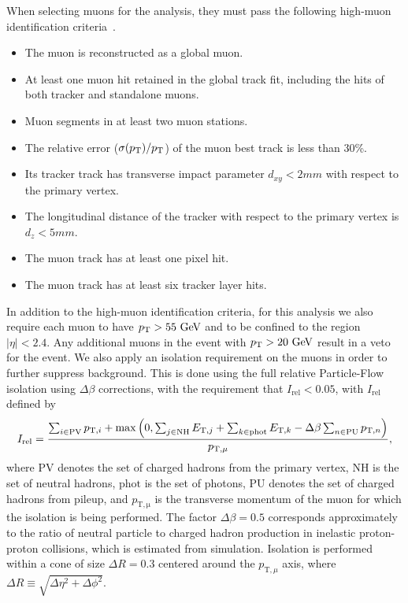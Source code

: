 When selecting muons for the analysis, they must pass the following high-\pt muon identification criteria~\cite{Sirunyan_2020}. %
\begin{itemize}
  \item The muon is reconstructed as a global muon.
  \item At least one muon hit retained in the global track fit, including the hits of both tracker and standalone muons.
  \item Muon segments in at least two muon stations.
  \item The \pt relative error ($\sigma(\pt)/\pt$) of the muon best track is less than 30\%.
  \item Its tracker track has transverse impact parameter $d_{xy}<2\unit{mm}$ with respect to the primary vertex.
  \item The longitudinal distance of the tracker with respect to the primary vertex is $d_z<5\unit{mm}$.
  \item The muon track has at least one pixel hit.
  \item The muon track has at least six tracker layer hits.
\end{itemize}

In addition to the high-\pt muon identification criteria, for this analysis we also require each muon to have $\pt>55\unit{GeV}$ and to be confined to the region $|\eta|<2.4$.
Any additional muons in the event with $\pt>20\unit{GeV}$ result in a veto for the event.
We also apply an isolation requirement on the muons in order to further suppress background.
This is done using the full relative Particle-Flow isolation using $\Delta\beta$ corrections, with the requirement that $I_\mathrm{rel}<0.05$, with $I_\mathrm{rel}$ defined by~\cite{Sirunyan_pf} %
\begin{equation}
  I_\mathrm{rel}=\frac{\sum_{i\in\mathrm{PV}}p_{\mathrm{T},i}+\max\pqty{0,\sum_{j\in\mathrm{NH}}E_{\mathrm{T},j}+\sum_{k\in\mathrm{phot}}E_{\mathrm{T},k}-\Delta\beta\sum_{n\in\mathrm{PU}}p_{\mathrm{T},n}}}{p_{\mathrm{T},\mu}},
\end{equation}
where $\mathrm{PV}$ denotes the set of charged hadrons from the primary vertex, $\mathrm{NH}$ is the set of neutral hadrons, $\mathrm{phot}$ is the set of photons, $\mathrm{PU}$ denotes the set of charged hadrons from pileup, and $p_\mathrm{T,\mu}$ is the transverse momentum of the muon for which the isolation is being performed.
The factor $\Delta\beta=0.5$ corresponds approximately to the ratio of neutral particle to charged hadron production in inelastic proton-proton collisions, which is estimated from simulation.
Isolation is performed within a cone of size $\Delta R=0.3$ centered around the $p_{\mathrm{T},\mu}$ axis, where $\Delta R\equiv\sqrt{\Delta\eta^2+\Delta\phi^2}$.

